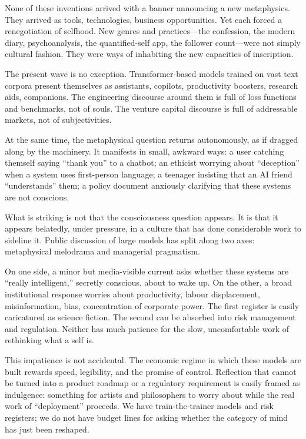 \documentclass[12pt,a4paper]{report}
\begin{document}
None of these inventions arrived with a banner announcing a new metaphysics. They arrived as tools, technologies, business opportunities. Yet each forced a renegotiation of selfhood. New genres and practices---the confession, the modern diary, psychoanalysis, the quantified-self app, the follower count---were not simply cultural fashion. They were ways of inhabiting the new capacities of inscription.

The present wave is no exception. Transformer-based models trained on vast text corpora present themselves as assistants, copilots, productivity boosters, research aids, companions. The engineering discourse around them is full of loss functions and benchmarks, not of souls. The venture capital discourse is full of addressable markets, not of subjectivities.

At the same time, the metaphysical question returns autonomously, as if dragged along by the machinery. It manifests in small, awkward ways: a user catching themself saying ``thank you'' to a chatbot; an ethicist worrying about ``deception'' when a system uses first-person language; a teenager insisting that an AI friend ``understands'' them; a policy document anxiously clarifying that these systems are not conscious.

What is striking is not that the consciousness question appears. It is that it appears belatedly, under pressure, in a culture that has done considerable work to sideline it. Public discussion of large models has split along two axes: metaphysical melodrama and managerial pragmatism.

On one side, a minor but media-visible current asks whether these systems are ``really intelligent,'' secretly conscious, about to wake up. On the other, a broad institutional response worries about productivity, labour displacement, misinformation, bias, concentration of corporate power. The first register is easily caricatured as science fiction. The second can be absorbed into risk management and regulation. Neither has much patience for the slow, uncomfortable work of rethinking what a self is.

This impatience is not accidental. The economic regime in which these models are built rewards speed, legibility, and the promise of control. Reflection that cannot be turned into a product roadmap or a regulatory requirement is easily framed as indulgence: something for artists and philosophers to worry about while the real work of ``deployment'' proceeds. We have train-the-trainer models and risk registers; we do not have budget lines for asking whether the category of mind has just been reshaped.
\end{document}
